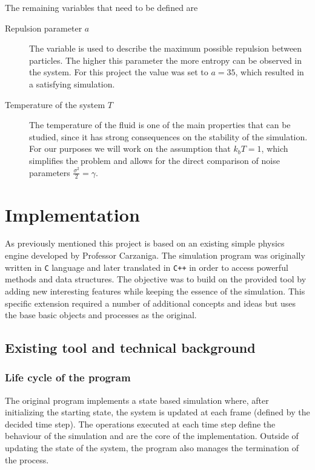 \documentclass[]{usiinfbachelorproject}
\begin{document}
The remaining variables that need to be defined are 

\begin{description}
  \item[Repulsion parameter $a$] The variable is used to describe the maximum possible repulsion between particles. 
  The higher this parameter the more entropy can be observed in the system. For this project the value was set to 
  $a = 35$, which resulted in a satisfying simulation.
  \item[Temperature of the system $T$] The temperature of the fluid is one of the main properties that can be studied, 
  since it has strong consequences on the stability of the simulation. For our purposes we will work on the assumption that 
  $k_b T = 1$, which simplifies the problem and allows for the direct comparison of noise parameters $\frac{\sigma^2}{2} = \gamma$.
\end{description}


\newpage
\section{Implementation}
As previously mentioned this project is based on an existing simple physics engine
 developed by Professor Carzaniga. The simulation program was originally written in 
\texttt{C} language and later translated in \texttt{C++} in order to access powerful methods and 
data structures. The objective was to build on the provided tool by adding new interesting 
features while keeping the essence of the simulation. This specific extension required a number 
of additional concepts and ideas but uses the base basic objects and processes as the original.
\subsection{Existing tool and technical background}
\subsubsection{Life cycle of the program}
The original program implements a state based simulation where, after initializing the starting state, the system is 
updated at each frame (defined by the decided time step). The operations executed at each time step define the 
behaviour of the simulation and are the core of the implementation. Outside of updating the state of the system, the 
program also manages the termination of the process. 
\end{document}
